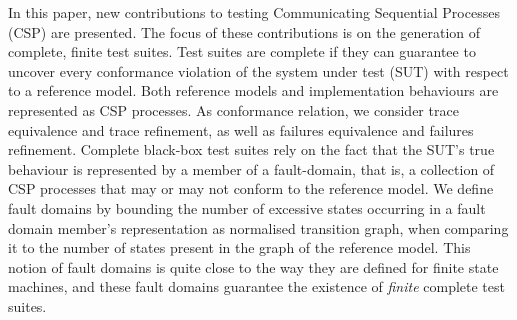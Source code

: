 In this paper, new contributions to testing Communicating Sequential Processes (CSP)
are presented. The focus of these contributions is on the generation of complete, finite
test suites. Test suites are complete if they can guarantee to uncover every 
conformance violation of the system under test (SUT) with respect to a reference model.
Both reference models and implementation behaviours are represented as CSP processes. As 
conformance relation, we consider trace equivalence and trace refinement, as well as 
failures equivalence and failures refinement. Complete black-box test suites rely on 
the fact that the SUT's true behaviour is represented by a member of a fault-domain, that is, a collection of CSP processes that may or may not conform to the reference 
model. We define fault domains by bounding the number of excessive states occurring 
in a fault domain member's representation as normalised transition graph, when comparing 
it to the number of states present in the graph of the reference model. This notion
of fault domains is quite close to the way they are defined for finite state machines, and
these fault domains guarantee the existence of {\it finite} complete test suites.
